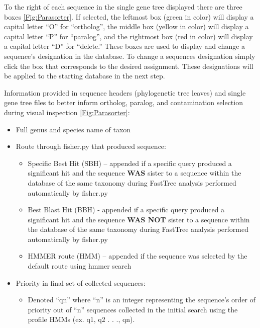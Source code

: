 \documentclass{article}
\begin{document}
\begin{enumerate}[itemsep=12pt]
    \vspace{0.2cm}
    To the right of each sequence in the single gene tree displayed there are three boxes \autoref{Fig:Parasorter}. If selected, the leftmost box (green in color) will display a capital letter “O” for “ortholog”, the middle box (yellow in color) will display a capital letter “P” for “paralog”, and the rightmost box (red in color) will display a capital letter “D” for “delete.” These boxes are used to display and change a sequence’s designation in the database. To change a sequences designation simply click the box that corresponds to the desired assignment. These designations will be applied to the starting database in the next step.
   
   \vspace{0.2cm}
    Information provided in sequence headers (phylogenetic tree leaves) and single gene tree files to better inform ortholog, paralog, and contamination selection during visual inspection \autoref{Fig:Parasorter}:
    \begin{itemize}
        \item Full genus and species name of taxon
        \item Route through fisher.py that produced sequence:
        \begin{itemize}
            \item Specific Best Hit (SBH) – appended if a specific query produced a significant hit and the sequence \textbf{WAS} sister to a sequence within the database of the same taxonomy during FastTree analysis performed automatically by fisher.py
            \item Best Blast Hit (BBH) - appended if a specific query produced a significant hit and the sequence \textbf{WAS NOT} sister to a sequence within the database of the same taxonomy during FastTree analysis performed automatically by fisher.py
            \item HMMER route (HMM) – appended if the sequence was selected by the default route using hmmer search
       \end{itemize}
       \item Priority in final set of collected sequences:
       \begin{itemize}
           \item Denoted “qn” where “n” is an integer representing the sequence’s order of priority out of “n” sequences collected in the initial search using the profile HMMs (ex. q1, q2 . . ., qn).
       \end{itemize}

\end{itemize}
\end{enumerate}
\end{document}
